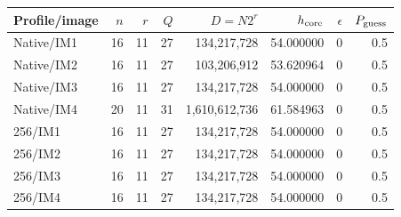 \begin{center}
{\footnotesize
\setlength{\tabcolsep}{4pt}
\begin{tabular}{@{}lrrrrrrr@{}}
\toprule
Profile/image & $n$ & $r$ & $Q$ & $D=N2^r$ & $h_{\rm core}$ & $\epsilon$ & $P_{\rm guess}$ \\
\midrule
Native/IM1 & 16 & 11 & 27 & 134,217,728 & 54.000000 & 0 & 0.5 \\
Native/IM2 & 16 & 11 & 27 & 103,206,912 & 53.620964 & 0 & 0.5 \\
Native/IM3 & 16 & 11 & 27 & 134,217,728 & 54.000000 & 0 & 0.5 \\
Native/IM4 & 20 & 11 & 31 & 1,610,612,736 & 61.584963 & 0 & 0.5 \\
256/IM1 & 16 & 11 & 27 & 134,217,728 & 54.000000 & 0 & 0.5 \\
256/IM2 & 16 & 11 & 27 & 134,217,728 & 54.000000 & 0 & 0.5 \\
256/IM3 & 16 & 11 & 27 & 134,217,728 & 54.000000 & 0 & 0.5 \\
256/IM4 & 16 & 11 & 27 & 134,217,728 & 54.000000 & 0 & 0.5 \\
\bottomrule
\end{tabular}}
\end{center}
